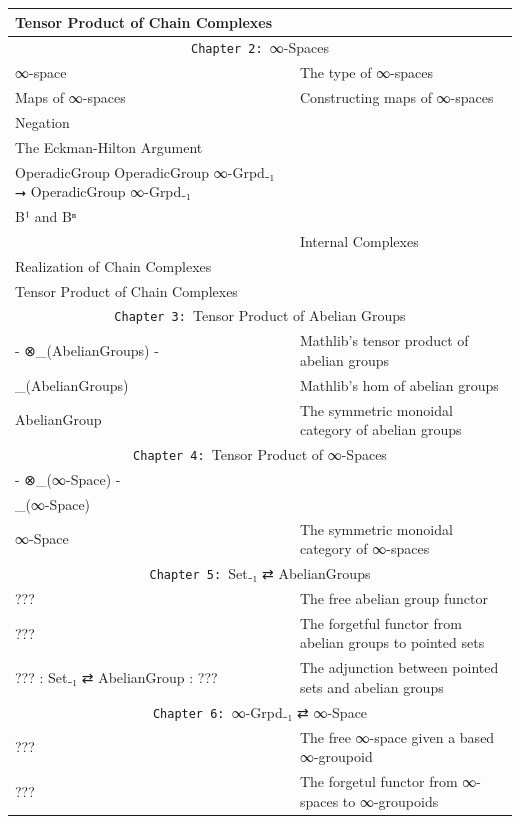 \documentclass{book}
\theoremstyle{definition}
\begin{document}
{\begin{longtable}{|| l || l ||}
Tensor Product of Chain Complexes & \\
\hline \hline
 \multicolumn{2}{||c||}{\texttt{Chapter 2: }∞-Spaces} \\
\hline \hline
∞-space & The type of ∞-spaces \\
\hline
Maps of ∞-spaces & Constructing maps of ∞-spaces \\
\hline
Negation & \\
\hline
The Eckman-Hilton Argument & \\
\hline
OperadicGroup OperadicGroup ∞-Grpd₋₁ ⭢ OperadicGroup ∞-Grpd₋₁ & \\
\hline
B¹ and Bⁿ & \\
\hline
[E⃗.obj ℕ, -] & Internal Complexes \\
\hline
Realization of Chain Complexes & \\
\hline
Tensor Product of Chain Complexes & \\
\hline \hline
\multicolumn{2}{||c||}{\texttt{Chapter 3: }Tensor Product of Abelian Groups} \\
\hline \hline
- ⊗\_(AbelianGroups) - & Mathlib's tensor product of abelian groups \\
\hline
[-,-]\_(AbelianGroups) & Mathlib's hom of abelian groups\\
\hline
AbelianGroup & The symmetric monoidal category of abelian groups\\
\hline \hline
\multicolumn{2}{||c||}{\texttt{Chapter 4: }Tensor Product of ∞-Spaces} \\
\hline \hline
- ⊗\_(∞-Space) - &  \\
\hline
[-,-]\_(∞-Space) &  \\
\hline
∞-Space & The symmetric monoidal category of ∞-spaces \\
\hline \hline
 \multicolumn{2}{||c||}{\texttt{Chapter 5: }Set₋₁ ⇄ AbelianGroups} \\
\hline \hline
??? & The free abelian group functor \\
 \hline
??? & The forgetful functor from abelian groups to pointed sets \\
 \hline
??? : Set₋₁ ⇄ AbelianGroup : ??? & The adjunction between pointed sets and abelian groups \\
\hline \hline
 \multicolumn{2}{||c||}{\texttt{Chapter 6: }∞-Grpd₋₁ ⇄ ∞-Space} \\
\hline \hline
??? & The free ∞-space given a based ∞-groupoid \\
\hline
??? & The forgetul functor from ∞-spaces to ∞-groupoids \\

\end{longtable}}
\end{document}
